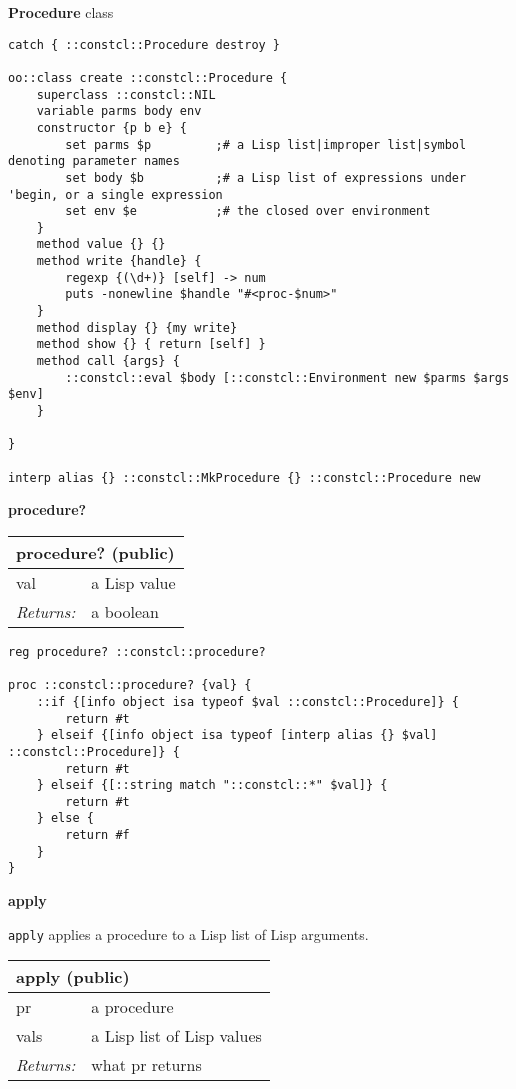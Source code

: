 \documentclass{report}
\begin{document}
\textbf{Procedure} class

\noindent\makebox[\linewidth]{\rule{\linewidth}{0.4pt}}
\begin{lstlisting}
catch { ::constcl::Procedure destroy }
 
oo::class create ::constcl::Procedure {
    superclass ::constcl::NIL
    variable parms body env
    constructor {p b e} {
        set parms $p         ;# a Lisp list|improper list|symbol denoting parameter names
        set body $b          ;# a Lisp list of expressions under 'begin, or a single expression
        set env $e           ;# the closed over environment
    }
    method value {} {}
    method write {handle} {
        regexp {(\d+)} [self] -> num
        puts -nonewline $handle "#<proc-$num>"
    }
    method display {} {my write}
    method show {} { return [self] }
    method call {args} {
        ::constcl::eval $body [::constcl::Environment new $parms $args $env]
    }
 
}
 
interp alias {} ::constcl::MkProcedure {} ::constcl::Procedure new
\end{lstlisting}
\noindent\makebox[\linewidth]{\rule{\linewidth}{0.4pt}}

\textbf{procedure?}

\begin{tabular}{ |l l| }
\hline
\multicolumn{2}{|l|}{procedure? (public)} \\
\hline
val & a Lisp value \\
\textit{Returns:} & a boolean \\
\hline
\end{tabular}

\noindent\makebox[\linewidth]{\rule{\linewidth}{0.4pt}}
\begin{lstlisting}
reg procedure? ::constcl::procedure?
 
proc ::constcl::procedure? {val} {
    ::if {[info object isa typeof $val ::constcl::Procedure]} {
        return #t
    } elseif {[info object isa typeof [interp alias {} $val] ::constcl::Procedure]} {
        return #t
    } elseif {[::string match "::constcl::*" $val]} {
        return #t
    } else {
        return #f
    }
}
\end{lstlisting}
\noindent\makebox[\linewidth]{\rule{\linewidth}{0.4pt}}

\textbf{apply}


\texttt{apply} applies a procedure to a Lisp list of Lisp arguments.

\begin{tabular}{ |l l| }
\hline
\multicolumn{2}{|l|}{apply (public)} \\
\hline
pr & a procedure \\
vals & a Lisp list of Lisp values \\
\textit{Returns:} & what pr returns \\
\hline
\end{tabular}
\end{document}
